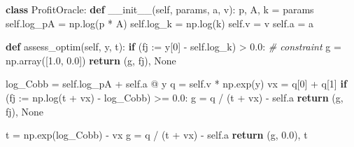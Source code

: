 \documentclass[
]{article}
\newenvironment{Shaded}{}{}
\newcommand{\CommentTok}[1]{\textcolor[rgb]{0.38,0.63,0.69}{\textit{#1}}}
\newcommand{\ControlFlowTok}[1]{\textcolor[rgb]{0.00,0.44,0.13}{\textbf{#1}}}
\newcommand{\DecValTok}[1]{\textcolor[rgb]{0.25,0.63,0.44}{#1}}
\newcommand{\FloatTok}[1]{\textcolor[rgb]{0.25,0.63,0.44}{#1}}
\newcommand{\FunctionTok}[1]{\textcolor[rgb]{0.02,0.16,0.49}{#1}}
\newcommand{\KeywordTok}[1]{\textcolor[rgb]{0.00,0.44,0.13}{\textbf{#1}}}
\newcommand{\NormalTok}[1]{#1}
\newcommand{\OperatorTok}[1]{\textcolor[rgb]{0.40,0.40,0.40}{#1}}
\newcommand{\VariableTok}[1]{\textcolor[rgb]{0.10,0.09,0.49}{#1}}
\begin{document}
\begin{Shaded}
\begin{Highlighting}[]
\KeywordTok{class}\NormalTok{ ProfitOracle:}
    \KeywordTok{def} \FunctionTok{\_\_init\_\_}\NormalTok{(}\VariableTok{self}\NormalTok{, params, a, v):}
\NormalTok{        p, A, k }\OperatorTok{=}\NormalTok{ params}
        \VariableTok{self}\NormalTok{.log\_pA }\OperatorTok{=}\NormalTok{ np.log(p }\OperatorTok{*}\NormalTok{ A)}
        \VariableTok{self}\NormalTok{.log\_k }\OperatorTok{=}\NormalTok{ np.log(k)}
        \VariableTok{self}\NormalTok{.v }\OperatorTok{=}\NormalTok{ v}
        \VariableTok{self}\NormalTok{.a }\OperatorTok{=}\NormalTok{ a}

    \KeywordTok{def}\NormalTok{ assess\_optim(}\VariableTok{self}\NormalTok{, y, t):}
        \ControlFlowTok{if}\NormalTok{ (fj }\OperatorTok{:=}\NormalTok{ y[}\DecValTok{0}\NormalTok{] }\OperatorTok{{-}} \VariableTok{self}\NormalTok{.log\_k) }\OperatorTok{\textgreater{}} \FloatTok{0.0}\NormalTok{:  }\CommentTok{\# constraint}
\NormalTok{            g }\OperatorTok{=}\NormalTok{ np.array([}\FloatTok{1.0}\NormalTok{, }\FloatTok{0.0}\NormalTok{])}
            \ControlFlowTok{return}\NormalTok{ (g, fj), }\VariableTok{None}

\NormalTok{        log\_Cobb }\OperatorTok{=} \VariableTok{self}\NormalTok{.log\_pA }\OperatorTok{+} \VariableTok{self}\NormalTok{.a }\OperatorTok{@}\NormalTok{ y}
\NormalTok{        q }\OperatorTok{=} \VariableTok{self}\NormalTok{.v }\OperatorTok{*}\NormalTok{ np.exp(y)}
\NormalTok{        vx }\OperatorTok{=}\NormalTok{ q[}\DecValTok{0}\NormalTok{] }\OperatorTok{+}\NormalTok{ q[}\DecValTok{1}\NormalTok{]}
        \ControlFlowTok{if}\NormalTok{ (fj }\OperatorTok{:=}\NormalTok{ np.log(t }\OperatorTok{+}\NormalTok{ vx) }\OperatorTok{{-}}\NormalTok{ log\_Cobb) }\OperatorTok{\textgreater{}=} \FloatTok{0.0}\NormalTok{:}
\NormalTok{            g }\OperatorTok{=}\NormalTok{ q }\OperatorTok{/}\NormalTok{ (t }\OperatorTok{+}\NormalTok{ vx) }\OperatorTok{{-}} \VariableTok{self}\NormalTok{.a}
            \ControlFlowTok{return}\NormalTok{ (g, fj), }\VariableTok{None}

\NormalTok{        t }\OperatorTok{=}\NormalTok{ np.exp(log\_Cobb) }\OperatorTok{{-}}\NormalTok{ vx}
\NormalTok{        g }\OperatorTok{=}\NormalTok{ q }\OperatorTok{/}\NormalTok{ (t }\OperatorTok{+}\NormalTok{ vx) }\OperatorTok{{-}} \VariableTok{self}\NormalTok{.a}
        \ControlFlowTok{return}\NormalTok{ (g, }\FloatTok{0.0}\NormalTok{), t}
\end{Highlighting}
\end{Shaded}
\end{document}
